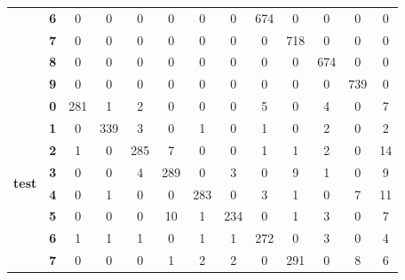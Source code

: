 \begin{table}[htp]
{\begin{tabular}{|c|c|c|c|c|c|c|c|c|c|c|c|c|}
		& \textbf{6} & 0          & 0          & 0          & 0          & 0          & 0          & 674        & 0          & 0          & 0          & 0                \\ \cline{2-13} 
		& \textbf{7} & 0          & 0          & 0          & 0          & 0          & 0          & 0          & 718        & 0          & 0          & 0                \\ \cline{2-13} 
		& \textbf{8} & 0          & 0          & 0          & 0          & 0          & 0          & 0          & 0          & 674        & 0          & 0                \\ \cline{2-13} 
		& \textbf{9} & 0          & 0          & 0          & 0          & 0          & 0          & 0          & 0          & 0          & 739        & 0                \\ \hline
		\multirow{10}{*}{\textbf{test}}     & \textbf{0} & 281        & 1          & 2          & 0          & 0          & 0          & 5          & 0          & 4          & 0          & 7                \\ \cline{2-13} 
		& \textbf{1} & 0          & 339        & 3          & 0          & 1          & 0          & 1          & 0          & 2          & 0          & 2                \\ \cline{2-13} 
		& \textbf{2} & 1          & 0          & 285        & 7          & 0          & 0          & 1          & 1          & 2          & 0          & 14               \\ \cline{2-13} 
		& \textbf{3} & 0          & 0          & 4          & 289        & 0          & 3          & 0          & 9          & 1          & 0          & 9                \\ \cline{2-13} 
		& \textbf{4} & 0          & 1          & 0          & 0          & 283        & 0          & 3          & 1          & 0          & 7          & 11               \\ \cline{2-13} 
		& \textbf{5} & 0          & 0          & 0          & 10         & 1          & 234        & 0          & 1          & 3          & 0          & 7                \\ \cline{2-13} 
		& \textbf{6} & 1          & 1          & 1          & 0          & 1          & 1          & 272        & 0          & 3          & 0          & 4                \\ \cline{2-13} 
		& \textbf{7} & 0          & 0          & 0          & 1          & 2          & 2          & 0          & 291        & 0          & 8          & 6                \\ \cline{2-13} 

\end{tabular}}
\end{table}
